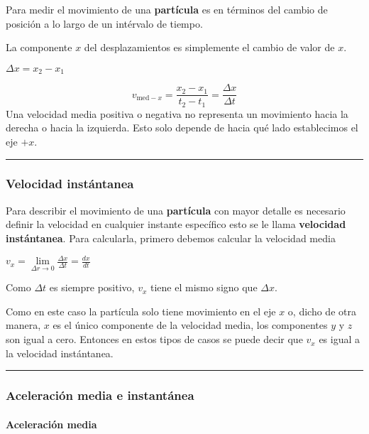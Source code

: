 \documentclass[
]{article}
\begin{document}
Para medir el movimiento de una \textbf{partícula} es en términos del
cambio de posición a lo largo de un intérvalo de tiempo.

La componente {\(x\)} del desplazamientos es simplemente el cambio de
valor de {\(x\)}.

{\(\Delta x = x_{2} - x_{1}\)}

{\[v_{\text{med} - x} = \frac{x_{2} - x_{1}}{t_{2} - t_{1}} = \frac{\Delta x}{\Delta t}\]}Una
velocidad media positiva o negativa no representa un movimiento hacia la
derecha o hacia la izquierda. Esto solo depende de hacia qué lado
establecimos el eje {\(+ x\)}.

\begin{center}\rule{0.5\linewidth}{0.5pt}\end{center}

\hypertarget{velocidad-instuxe1ntanea}{%
\subsubsection{Velocidad instántanea}\label{velocidad-instuxe1ntanea}}

Para describir el movimiento de una \textbf{partícula} con mayor detalle
es necesario definir la velocidad en cualquier instante específico esto
se le llama \textbf{velocidad instántanea}. Para calcularla, primero
debemos calcular la velocidad media

{\(v_{x} = \lim\limits_{\Delta r \rightarrow 0}\frac{\Delta x}{\Delta t} = \frac{dx}{dt}\)}

Como {\(\Delta t\)} es siempre positivo, {\(v_{x}\)} tiene el mismo
signo que {\(\Delta x\)}.

Como en este caso la partícula solo tiene movimiento en el eje {\(x\)}
o, dicho de otra manera, {\(x\)} es el único componente de la velocidad
media, los componentes {\(y\)} y {\(z\)} son igual a cero. Entonces en
estos tipos de casos se puede decir que {\(v_{x}\)} es igual a la
velocidad instántanea.

\begin{center}\rule{0.5\linewidth}{0.5pt}\end{center}

\hypertarget{aceleraciuxf3n-media-e-instantuxe1nea}{%
\subsubsection{Aceleración media e
instantánea}\label{aceleraciuxf3n-media-e-instantuxe1nea}}

\hypertarget{aceleraciuxf3n-media}{%
\paragraph{Aceleración media}\label{aceleraciuxf3n-media}}
\end{document}
